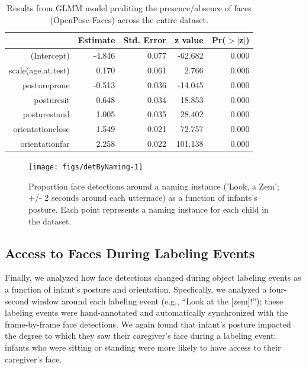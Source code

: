 \documentclass[10pt, letterpaper]{article}
\newenvironment{CodeChunk}{}{}
\begin{document}
\begin{table}[H]
\centering
\begin{tabular}{rrrrr}
  \hline
 & Estimate & Std. Error & z value & Pr($>$$|$z$|$) \\ 
  \hline
(Intercept) & -4.846 & 0.077 & -62.682 & 0.000 \\ 
  scale(age.at.test) & 0.170 & 0.061 & 2.766 & 0.006 \\ 
  postureprone & -0.513 & 0.036 & -14.045 & 0.000 \\ 
  posturesit & 0.648 & 0.034 & 18.853 & 0.000 \\ 
  posturestand & 1.005 & 0.035 & 28.402 & 0.000 \\ 
  orientationclose & 1.549 & 0.021 & 72.757 & 0.000 \\ 
  orientationfar & 2.258 & 0.022 & 101.138 & 0.000 \\ 
   \hline
\end{tabular}
\caption{Results from GLMM model prediting the presence/absence of faces (OpenPose-Faces) across the entire dataset.} 
\end{table}

\begin{CodeChunk}
\begin{figure}[H]

{\centering \texttt{[image: figs/detByNaming-1]} 

}

\caption[Proportion face detections around a naming instance ('Look, a Zem']{Proportion face detections around a naming instance ('Look, a Zem'; +/- 2 seconds around each utternace) as a function of infants's posture. Each point represents a naming instance for each child in the dataset.}\label{fig:detByNaming}
\end{figure}
\end{CodeChunk}

\subsection{Access to Faces During Labeling
Events}\label{access-to-faces-during-labeling-events}

Finally, we analyzed how face detections changed during object labeling
events as a function of infant's posture and orientation. Specfically,
we analyzed a four-second window around each labeling event (e.g.,
``Look at the {[}zem{]}!''); these labeling events were hand-annotated
and automatically synchronized with the frame-by-frame face detections.
We again found that infant's posture impacted the degree to which they
saw their caregiver's face during a labeling event; infants who were
sitting or standing were more likely to have access to their caregiver's
face.
\end{document}
